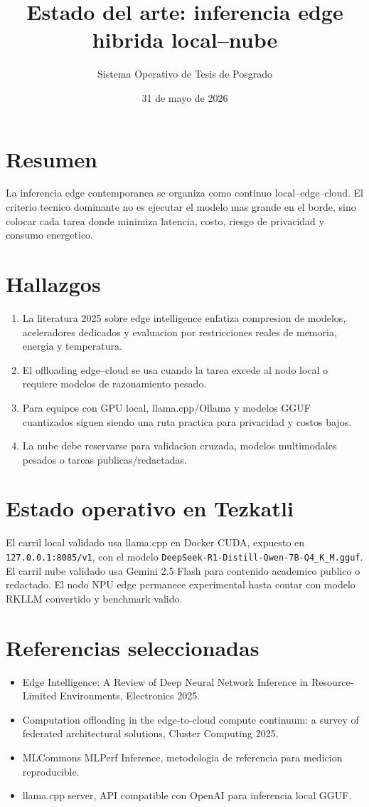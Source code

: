 \documentclass[11pt]{article}
\title{Estado del arte: inferencia edge hibrida local--nube}
\author{Sistema Operativo de Tesis de Posgrado}
\date{31 de mayo de 2026}
\begin{document}
\maketitle

\section*{Resumen}
La inferencia edge contemporanea se organiza como continuo local--edge--cloud. El criterio tecnico dominante no es ejecutar el modelo mas grande en el borde, sino colocar cada tarea donde minimiza latencia, costo, riesgo de privacidad y consumo energetico.

\section*{Hallazgos}
\begin{enumerate}[leftmargin=*]
\item La literatura 2025 sobre edge intelligence enfatiza compresion de modelos, aceleradores dedicados y evaluacion por restricciones reales de memoria, energia y temperatura.
\item El offloading edge--cloud se usa cuando la tarea excede al nodo local o requiere modelos de razonamiento pesado.
\item Para equipos con GPU local, llama.cpp/Ollama y modelos GGUF cuantizados siguen siendo una ruta practica para privacidad y costos bajos.
\item La nube debe reservarse para validacion cruzada, modelos multimodales pesados o tareas publicas/redactadas.
\end{enumerate}

\section*{Estado operativo en Tezkatli}
El carril local validado usa llama.cpp en Docker CUDA, expuesto en \texttt{127.0.0.1:8085/v1}, con el modelo \texttt{DeepSeek-R1-Distill-Qwen-7B-Q4\_K\_M.gguf}. El carril nube validado usa Gemini 2.5 Flash para contenido academico publico o redactado. El nodo NPU edge permanece experimental hasta contar con modelo RKLLM convertido y benchmark valido.

\section*{Referencias seleccionadas}
\begin{itemize}[leftmargin=*]
\item Edge Intelligence: A Review of Deep Neural Network Inference in Resource-Limited Environments, Electronics 2025.
\item Computation offloading in the edge-to-cloud compute continuum: a survey of federated architectural solutions, Cluster Computing 2025.
\item MLCommons MLPerf Inference, metodologia de referencia para medicion reproducible.
\item llama.cpp server, API compatible con OpenAI para inferencia local GGUF.
\end{itemize}
\end{document}
